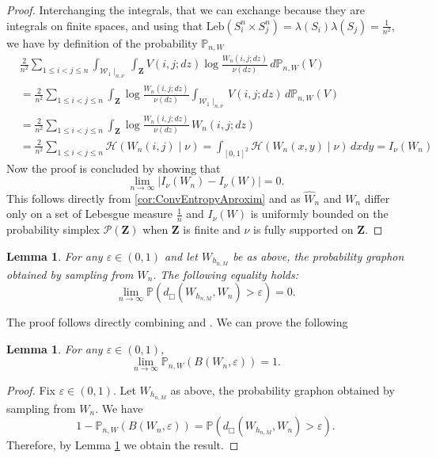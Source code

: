 \documentclass[12pt,twoside,a4paper]{article}
\newtheorem{lemma}[theorem]{Lemma}
\newcommand{\cP}{{\mathcal P}}  %
\newcommand{\Square}{{S^n_i\times S^n_j}}
\newcommand{\Space}{\mathbf{Z}}
\begin{document}
\begin{proof}
Interchanging the integrals, that we can exchange because they are integrals on finite spaces, and using that $\text{Leb}(\Square)= \lambda(S_i)\lambda(S_j)=\frac1{n^2}$, we have by definition of the probability $\mathbb{P}_{n,W}$
\[
\begin{split}
&\frac{2}{n^2} \sum_{1\leq i<j\leq n}\int_{\mathcal{W}_1\mid_{n,\nu}}\int_\Space V(i,j;dz)\log \frac{W_n(i,j;dz)}{\nu(dz)} \, d\mathbb{P}_{n,W}(V)\\
&=\frac{2}{n^2} \sum_{1\leq i<j\leq n}\int_{\Space}\log \frac{W_n(i,j;dz)}{\nu(dz)}\int_{\mathcal{W}_1\mid_{n,\nu}}V(i,j;dz) \, d\mathbb{P}_{n,W}(V)
\\&=\frac{2}{n^2} \sum_{1\leq i<j\leq n}\int_{\Space}\log \frac{W_n(i,j;dz)}{\nu(dz)}\,W_n(i,j;dz)
\\&=\frac{2}{n^2} \sum_{1\leq i<j\leq n}\mathcal{H}(W_n(i,j)\mid \nu)=\int_{[0,1]^2}\mathcal{H}(W_n(x,y)\mid \nu)\, dxdy=I_\nu(W_n)
\end{split}
\]
Now the proof is concluded by showing that 
\[
\lim_{n\to\infty}|I_\nu(W_n)-I_\nu(W)|=0.
\]
This follows directly from \ref{cor:ConvEntropyAproxim} and as $\widehat{W}_n$ and $W_n$ differ only on a set of Lebesgue measure $\tfrac{1}{n}$ and $I_\nu(W)$ is uniformly bounded on the probability simplex $\cP(\Space)$ when $\Space$ is finite and $\nu$ is fully supported on $\Space.$
\end{proof}

\begin{lemma}\label{lemm:auxBall1}
 For any $\varepsilon \in (0,1)$ and let $W_{h_{n,M}}$ be as above, the probability graphon obtained by sampling from $W_n.$ The following equality holds: 
 \begin{equation*}
     \lim_{n \to \infty} \mathbb{P}(d_{\Box}(W_{h_{n,M}}, W_n) > \varepsilon) =0.
 \end{equation*}
\end{lemma}
\proof
The proof follows directly combining \cite[Lemma 6.9]{abraham2023probabilitygraphons} and \cite[Proposition 1.2]{abraham2023probabilitygraphons}.
\endproof
We can prove the following
\begin{lemma}\label{lem:ballto1}
For any $\varepsilon \in (0,1)$, 
\[
\lim_{n \to \infty} \mathbb{P}_{n,W}(B(W_n, \varepsilon)) = 1.
\]
\end{lemma}

\begin{proof}
Fix $\varepsilon \in (0,1)$. Let $W_{h_{n,M}}$ as above, the probability graphon obtained by sampling from $W_n$. We have
\[
1 - \mathbb{P}_{n,W}(B(W_n,\varepsilon)) = \mathbb{P}(d_{\Box}(W_{h_{n,M}}, W_n) > \varepsilon) .
\]
Therefore, by Lemma \ref{lemm:auxBall1} we obtain the result.
\end{proof}
\end{document}
